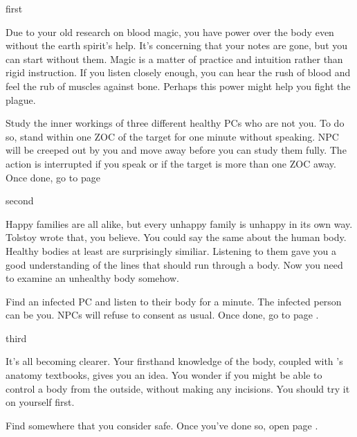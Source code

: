 \documentclass[greennotebook]{Pestilence} %
\begin{document}
\startnotebook{\nRebelLab{}}

\begin{page}{first}

Due to your old research on blood magic, you have power over the body even without the earth spirit's help. It's concerning that your notes are gone, but you can start without them. Magic is a matter of practice and intuition rather than rigid instruction. If you listen closely enough, you can hear the rush of blood and feel the rub of muscles against bone. Perhaps this power might help you fight the plague. 

Study the inner workings of three different healthy PCs who are not you. To do so, stand within one ZOC of the target for one minute without speaking. NPC will be creeped out by you and move away before you can study them fully. The action is interrupted if you speak or if the target is more than one ZOC away. Once done, go to page 

\end{page}

\begin{page}{second}

Happy families are all alike, but every unhappy family is unhappy in its own way. Tolstoy wrote that, you believe. You could say the same about the human body. Healthy bodies at least are surprisingly similiar. Listening to them gave you a good understanding of the lines that should run through a body. Now you need to examine an unhealthy body somehow.

Find an infected PC and listen to their body for a minute. The infected person can be you. NPCs will refuse to consent as usual. Once done, go to page .

\end{page}

\begin{page}{third}

It's all becoming clearer. Your firsthand knowledge of the body, coupled with \cOutsider{}'s anatomy textbooks, gives you an idea. You wonder if you might be able to control a body from the outside, without making any incisions. You should try it on yourself first.

Find somewhere that you consider safe. Once you've done so, open page .

\end{page}
\end{document}
